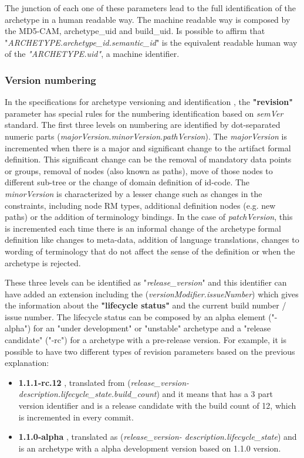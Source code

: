 \documentclass[mim_thesis.tex]{subfiles}
\begin{document}
The junction of each one of these parameters lead to the full identification of the archetype in a human readable way. The machine readable way is composed by the MD5-CAM, archetype\_uid and build\_uid. Is possible to affirm that "\textit{ARCHETYPE.archetype\_id.semantic\_id}" is the equivalent readable human way of the \textit{"ARCHETYPE.uid"}, a machine identifier.\\


\subsubsection{Version numbering}

In the specifications for archetype versioning and identification \citep{openEHRarchver}, the \textbf{"revision"} parameter has special rules for the numbering identification based on \textit{semVer} standard. The first three levels on numbering are identified by dot-separated numeric parts (\textit{majorVersion.minorVersion.pathVersion}). 
The \textit{majorVersion} is incremented when there is a major and significant change to the artifact formal definition. This significant change can be the removal of mandatory data points or groups, removal of nodes (also known as paths), move of those nodes to different sub-tree or the change of domain definition of id-code. The \textit{minorVersion} is characterized by a lesser change such as changes in the constraints, including node RM types, additional definition nodes (e.g. new paths) or the addition of terminology bindings. In the case of \textit{patchVersion}, this is incremented each time there is an informal change of the archetype formal definition like changes to meta-data, addition of language translations, changes to wording of terminology that do not affect the sense of the definition or when the archetype is rejected. \citep{openEHRAOM_AIS} \par
These three levels can be identified as "\textit{release\_version}" and this identifier can have added an extension including the (\textit{versionModifier.issueNumber}) which gives the information about the \textbf{"lifecycle status"} and the current build number / issue number. The lifecycle status can be composed by an alpha element ("-alpha") for an "under development" or "unstable" archetype and a "release candidate" ("-rc") for a archetype with a pre-release version. For example, it is possible to have two different types of revision parameters based on the previous explanation:

\begin{itemize}[noitemsep]
\item \textbf{1.1.1-rc.12} , translated from (\textit{release\_version-description.lifecycle\_state.build\_count}) and it means that has a 3 part version identifier and is a release candidate with the build count of 12, which is incremented in every commit.
\item \textbf{1.1.0-alpha} , translated as (\textit{release\_version- description.lifecycle\_state}) and is an archetype with a alpha development version based on 1.1.0 version. 
\end{itemize}
\end{document}

